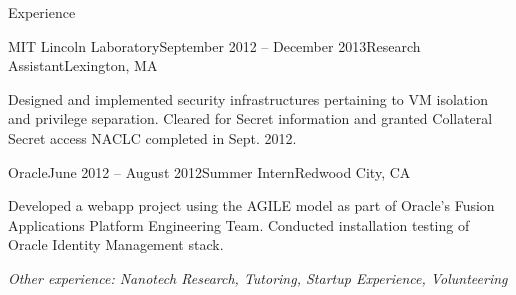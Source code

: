 \documentclass{resume} %
\begin{document}
\begin{rSection}{Experience}
\begin{rSubsection}{MIT Lincoln Laboratory}{September 2012 -- December 2013}{Research Assistant}{Lexington, MA}
\item Designed and implemented security infrastructures pertaining to VM isolation and privilege separation. Cleared for Secret information and granted Collateral Secret access NACLC completed in Sept. 2012.
\end{rSubsection}


\begin{rSubsection}{Oracle}{June 2012 -- August 2012}{Summer Intern}{Redwood City, CA}
\item Developed a webapp project using the AGILE model as part of Oracle's Fusion Applications Platform Engineering Team. Conducted installation testing of Oracle Identity Management stack. %
\end{rSubsection}






%

\em{Other experience: Nanotech Research, Tutoring, Startup Experience, Volunteering}
\end{rSection}
\end{document}
